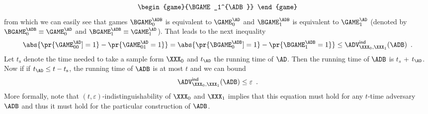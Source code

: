 \documentclass{crypto-exercise}
\renewcommand{\ADVIND}[2]{\ADV^{\mathsf{ind}}_{#1}(#2)}
\newcommand{\ts}{t_{\mathrm{s}}}
\begin{document}
\begin{solution}
\begin{align*}
\begin{game}{\BGAME_1^{\ADB}}
    \end{game}
\end{align*}
from which we can easily see that games $\BGAME_0^\ADB$ is equivalent to $\GAME_0^\AD$ and $\BGAME_1^\ADB$ is equivalent to $\GAME_1^\AD$ (denoted by $\BGAME_0^\ADB\equiv\GAME_0^\AD$ and $\BGAME_1^\ADB\equiv\GAME_1^\AD$). That leads to the next inequality
\begin{align*}
\abs{\pr{\GAME_{00}^{\AD}] = 1} - \pr{\GAME_{01}^{\AD} = 1}}=\abs{\pr{\BGAME_0^{\ADB}] = 1} - \pr{\BGAME_1^{\ADB} = 1}} \leq \ADVIND{\XXX_0,\XXX_1}{\ADB}\enspace. 
\end{align*}
Let $\ts$ denote the time needed to take a sample form $\XXX_0$ and $t_\AD$ the running time of $\AD$. Then the running time of $\ADB$ is $t_s$ + $t_{\AD}$. Now if if $t_\AD\leq t-\ts$, the running time of $\ADB$ is at most $t$ and we can bound
\begin{align*}
\ADVIND{\XXX_0,\XXX_1}{\ADB}\leq \varepsilon\enspace.
\end{align*} 
More formally, note that $(t,\varepsilon)$-indistinguishability of $\XXX_0$ and $\XXX_1$ implies that this equation must hold for any $t$-time adversary $\ADB$ and thus it must hold for the particular construction of $\ADB$.  


\end{solution}
\end{document}
